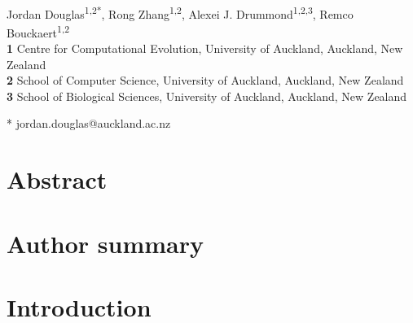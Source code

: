 \documentclass[10pt,letterpaper]{article}
\begin{document}
\vspace*{0.2in}

\begin{flushleft}
{\Large
\textbf{} %
}
\newline
\\
Jordan Douglas\textsuperscript{1,2*},
Rong Zhang\textsuperscript{1,2},
Alexei J. Drummond\textsuperscript{1,2,3},
Remco Bouckaert\textsuperscript{1,2}
\\
\bigskip
\textbf{1} Centre for Computational Evolution,  University of Auckland, Auckland, New Zealand\\
\textbf{2} School of Computer Science, University of Auckland, Auckland, New Zealand\\
\textbf{3} School of Biological Sciences, University of Auckland, Auckland, New Zealand
\\
\bigskip


* jordan.douglas@auckland.ac.nz


\end{flushleft}
\section*{Abstract}




\section*{Author summary}




\linenumbers

\section*{Introduction}
\end{document}
